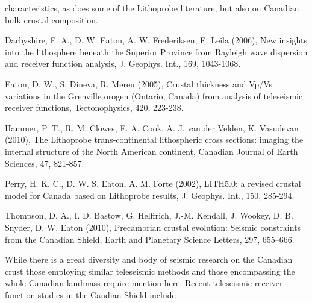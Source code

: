 \documentclass[draft, 12pt]{article}
\begin{document}
characteristics, as does some of the Lithoprobe literature, but also on Canadian bulk crustal composition.


Darbyshire, F. A., D. W. Eaton, A. W. Frederiksen, E. Leila (2006), New insights into the lithosphere beneath the Superior Province from Rayleigh wave dispersion and receiver function analysis, J. Geophys. Int., 169, 1043-1068.

Eaton, D. W., S. Dineva, R. Mereu (2005), Crustal thickness and Vp/Vs variations in the Grenville orogen (Ontario, Canada) from analysis of teleseismic receiver functions, Tectonophysics, 420, 223-238.

Hammer, P. T., R. M. Clowes, F. A. Cook, A. J. van der Velden, K. Vasudevan (2010), The Lithoprobe trans-continental lithospheric cross sections: imaging the internal structure of the North American continent, Canadian Journal of Earth Sciences, 47, 821-857.

Perry, H. K. C., D. W. S. Eaton, A. M. Forte (2002), LITH5.0: a revised crustal model for Canada based on Lithoprobe results,  J. Geophys. Int., 150, 285-294.

Thompson, D. A., I. D. Bastow, G. Helffrich, J.-M. Kendall, J. Wookey, D. B. Snyder, D. W. Eaton (2010), Precambrian crustal evolution: Seismic constraints from the Canadian Shield, Earth and Planetary Science Letters, 297, 655–666.


While there is a great diversity and body of seismic research on the Canadian crust those employing similar teleseismic methods and those encompassing the whole Canadian landmass require mention here. Recent teleseismic receiver function studies in the Candian Shield include
\end{document}
